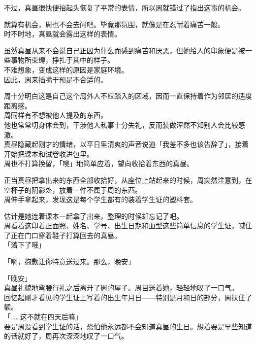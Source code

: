 不过，真昼很快便抬起头恢复了平常的表情，所以周就错过了指出这事的机会。

就算有机会，周也不会去问吧。毕竟那氛围，就像是在忍耐着痛苦一般。\\%

时不时地，真昼就会露出这样的表情。

虽然真昼从来不会说自己正因为什么而感到痛苦和厌恶，但她给人的印象便是被一些事物所束缚，挣扎于其中的样子。\\

不难想象，变成这样的原因是家庭环境。\\

因此，周来插嘴干预是不合适的。

周十分明白这是自己这个局外人不应踏入的区域，因而一直保持着作为邻居的适度距离感。\\

周同样有不想被他人提及的东西。\\

他也常常切身体会到，干涉他人私事十分失礼，反而装做浑然不知别人会比较感激。\\%

真昼隐藏起刚才的情绪，以平日里清爽的声音说道「我差不多也该告辞了」，接着开始把课本和试卷收进包里。\\

周也不打算挽留，「噢」地简单应着，望向收拾着东西的真昼。

正当真昼把拿出来的东西全部收拾好，从座位上站起来的时候，周突然注意到，在空杯子的阴影处，放着一件不属于周的东西。\\

周伸手拿起来，发现这是每个学生都有的装着学生证的塑料套。

估计是她连着课本一起拿了出来，整理的时候却忘记了吧。\\

周看着这印着正面照、姓名、学号、出生日期和血型这些简单信息的学生证，喊住了正在门口穿着鞋子打算回去的真昼。\\

「落下了哦」

「啊，抱歉让你特意送过来。那么，晚安」

「晚安」\\

真昼礼貌地弯腰行礼之后离开了周的屋子。周目送着她，轻轻地叹了一口气。\\

回忆起刚才看见的学生证上写着的出生年月日——特别是月和日的部分，周扶住了额。\\

「……这不就在四天后嘛」\\

要是周没看到学生证的话，恐怕他永远都不会知道真昼的生日。想着要是早些知道的话就好了，周再次深深地叹了一口气。

